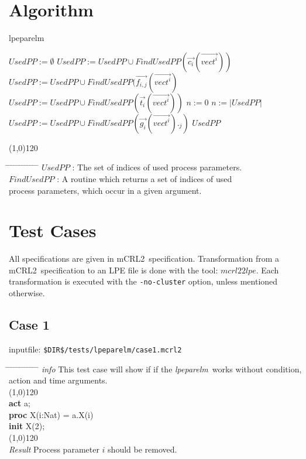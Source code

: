 \documentclass[a4paper,10pt]{article}
\theoremstyle{plain}
\theoremstyle{definition}
\newcommand{\mcrl}{mCRL2}
\newcommand{\tool}{\textit{lpeparelm}}
\newcommand{\ti}{\textit}
\newcommand{\tb}{\textbf}
\newcommand{\ovr}{\overrightarrow}
\newcommand{\pps}{process parameters}
\newcommand{\tab}{\hspace*{5.mm} \= \hspace*{5.mm} \= \hspace*{5.mm} \= \hspace*{5.mm} \= \hspace*{5.mm} \= \hspace*{5.mm}  \= \hspace*{5.mm}  \= \hspace*{5.mm}  \= \hspace*{5.mm} \= \hspace*{5.mm} \= \hspace*{5.mm}  \= \hspace*{5.mm}  \= \hspace*{5.mm}\kill}
\newcommand{\tabw}{\hspace*{15.mm} \= \hspace*{20.mm} \= \hspace*{5.mm} \= \hspace*{5.mm} \= \hspace*{5.mm} \= \hspace*{5.mm}  \= \hspace*{5.mm}  \= \hspace*{5.mm}  \= \hspace*{5.mm} \= \hspace*{5.mm} \= \hspace*{5.mm}  \= \hspace*{5.mm}  \= \hspace*{5.mm}\kill}
\begin{document}
\newpage
\section{Algorithm} \label{sec:alg}
\begin{algorithm}[h]
\caption{lpeparelm}
\begin{algorithmic}[1]
\STATE $UsedPP := \emptyset $
    \STATE $UsedPP := UsedPP \cup FindUsedPP(\ovr{c_i}(\ovr{vect^i}))$
      \STATE $UsedPP := UsedPP \cup FindUsedPP(\ovr{f_{i,j}}(\ovr{vect^i})$
    \ENDFOR
    \STATE $UsedPP := UsedPP \cup FindUsedPP(\ovr{t_i}(\ovr{vect^i}))$
  \ENDFOR
\STATE $n := 0$
\STATE $n := \vert UsedPP \vert$
      \STATE $UsedPP := UsedPP \cup FindUsedPP(\ovr{g_i}(\ovr{vect^i})._j) $
    \ENDFOR
  \ENDFOR
\ENDWHILE
\RETURN $UsedPP$
\end{algorithmic}
\line(1,0){120}
\begin{tabbing}
\tab
$UsedPP$ \> \> \> \> : \> The set of indices of used \pps .\\
$FindUsedPP$ \> \> \> \> : \> A routine which returns a set of indices of used\\
\> \> \> \> \> \pps, which occur in a given argument.
\end{tabbing}
\end{algorithm}

\newpage
\section{Test Cases}
All specifications are given in \mcrl\ specification.
Transformation from a \mcrl\ specification to an LPE file is done with the tool:
$mcrl22lpe$. Each transformation is executed with the \verb"-no-cluster" option, unless
mentioned otherwise.

\subsection*{Case 1}
inputfile: \verb"$DIR$/tests/lpeparelm/case1.mcrl2"
\begin{tabbing}
\tabw
\ti{info} \> This test case will show if if the \tool\ works without condition, action and time arguments.\\
\line(1,0){120}\\
\tb{act} \> a; \\
\tb{proc} \> X(i:Nat) = \> a.X(i)\\
\tb{init} \> X(2); \\  
\line(1,0){120}\\
\ti{Result} \> Process parameter $i$ should be removed.\\ 
\end{tabbing}
\end{document}
